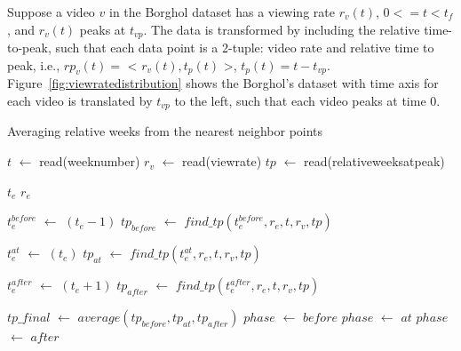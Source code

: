 Suppose a video $v$ in the Borghol dataset has a viewing rate $r_v(t)$, $0 <= t < t_f$, and $r_v(t)$ peaks at $t_{vp}$.
The data is transformed by including the relative time-to-peak, such that each data point is a 2-tuple: video rate and relative time to peak, i.e., $rp_v(t) =$ < $r_v(t), t_p(t)$ >, $t_p(t) = t - t_{vp}$.
Figure~\ref{fig:viewratedistribution} shows the Borghol's dataset with time axis for each video is translated by $t_{vp}$ to the left, such that each video peaks at time $0$.



\begin{algorithm}
\caption{Averaging relative weeks from the nearest neighbor points}
\label{alg2}
\begin{algorithmic}[1]

\STATE $t$ $\leftarrow$ read(weeknumber) 
\STATE $r_v$ $\leftarrow$ read(viewrate) 
\STATE $tp$ $\leftarrow$ read(relativeweeksatpeak) 

\STATE $t_e$ 
\STATE $r_e$ 

\STATE $t_e^{before}$ $\leftarrow$ $(t_e - 1)$ 
\STATE $tp_{before}$ $\leftarrow$ $find\_tp(t_e^{before},r_e,t,r_v,tp)$

\STATE $t_e^{at}$ $\leftarrow$ $(t_e)$ 
\STATE $tp_{at}$ $\leftarrow$ $find\_tp(t_e^{at},r_e,t,r_v,tp)$

\STATE $t_e^{after}$ $\leftarrow$ $(t_e+1)$ 
\STATE $tp_{after}$ $\leftarrow$ $find\_tp(t_e^{after},r_e,t,r_v,tp)$

\STATE $tp\_final$ $\leftarrow$ $average(tp_{before}, tp_{at}, tp_{after})$
\STATE $phase$ $\leftarrow$ $before$
\STATE $phase$ $\leftarrow$ $at$
\ELSE
\STATE $phase$ $\leftarrow$ $after$
\ENDIF
\end{algorithmic}
\end{algorithm}

